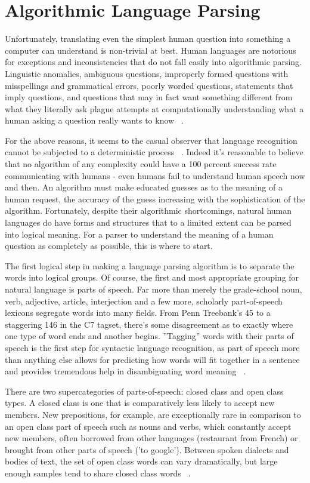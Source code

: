 \documentclass[12pt]{article}
\begin{document}
\section*{Algorithmic Language Parsing}
Unfortunately, translating even the simplest human question into something a computer can understand is non-trivial at best. Human languages are notorious for exceptions and inconsistencies that do not fall easily into algorithmic parsing. Linguistic anomalies, ambiguous questions, improperly formed questions with misspellings and grammatical errors, poorly worded questions, statements that imply questions, and questions that may in fact want something different from what they literally ask plague attempts at computationally understanding what a human asking a question really wants to know ~\citep{Jurafsky}.

For the above reasons, it seems to the casual observer that language recognition cannot be subjected to a deterministic process ~\citep{Marcus}. Indeed it's reasonable to believe that no algorithm of any complexity could have a 100 percent success rate communicating with humans - even humans fail to understand human speech now and then. An algorithm must make educated guesses as to the meaning of a human request, the accuracy of the guess increasing with the sophistication of the algorithm. Fortunately, despite their algorithmic shortcomings, natural human languages do have forms and structures that to a limited extent can be parsed into logical meaning. For a parser to understand the meaning of a human question as completely as possible, this is where to start.

The first logical step in making a language parsing algorithm is to separate the words into logical groups. Of course, the first and most appropriate grouping for natural language is parts of speech. Far more than merely the grade-school noun, verb, adjective, article, interjection and a few more, scholarly part-of-speech lexicons segregate words into many fields. From Penn Treebank's 45 to a staggering 146 in the C7 tagset, there's some disagreement as to exactly where one type of word ends and another begins. ''Tagging'' words with their parts of speech is the first step for syntactic language recognition, as part of speech more than anything else allows for predicting how words will fit together in a sentence and provides tremendous help in disambiguating word meaning ~\citep{Jurafsky}.

There are two supercategories of parts-of-speech: closed class and open class types. A closed class is one that is comparatively less likely to accept new members.  New prepositions, for example, are exceptionally rare in comparison to an open class part of speech such as nouns and verbs, which constantly accept new members, often borrowed from other languages (restaurant from French) or brought from other parts of speech ('to google'). Between spoken dialects and bodies of text, the set of open class words can vary dramatically, but large enough samples tend to share closed class words ~\citep{Jurafsky}. 
\end{document}
